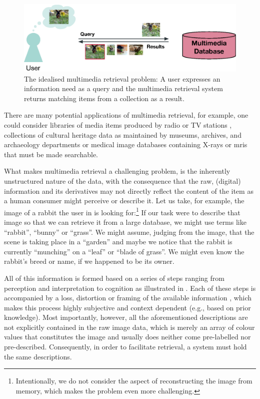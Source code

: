\begin{figure}[tb]
    \centering
    \includegraphics[width=\textwidth]{figures/mr-ideal.eps}
    \caption{The idealised multimedia retrieval problem: A user expresses an information need as a query and the multimedia retrieval system returns matching items from a collection as a result.}
    \label{figure:mr-ideal}
\end{figure}

There are many potential applications of multimedia retrieval, for example, one could consider libraries of media items produced by radio or TV stations \cite{Watanabe:1998Multimedia}, collections of cultural heritage data as maintained by museums, archives, and archaeology departments \cite{Tsai:2007Review} or medical image databases containing X-rays or \acrshort{mri}s \cite{Mueller:2004Review} that must be made searchable.

What makes multimedia retrieval a challenging problem, is the inherently unstructured nature of the data, with the consequence that the raw, (digital) information and its derivatives may not directly reflect the content of the item as a human consumer might perceive or describe it. Let us take, for example, the image of a rabbit the user in  is looking for:\footnote{Intentionally, we do not consider the aspect of reconstructing the image from memory, which makes the problem even more challenging.} If our task were to describe that image so that we can retrieve it from a large database, we might use terms like ``rabbit'', ``bunny'' or ``grass''. We might assume, judging from the image, that the scene is taking place in a ``garden'' and maybe we notice that the rabbit is currently ``munching'' on a ``leaf'' or ``blade of grass''. We might even know the rabbit's breed or name, if we happened to be its owner.

All of this information is formed based on a series of steps ranging from perception and interpretation to cognition as illustrated in . Each of these steps is accompanied by a loss, distortion or framing of the available information \cite{Javanmardi:2021Exploring}, which makes this process highly subjective and context dependent (e.g., based on prior knowledge). Most importantly, however, all the aforementioned descriptions are not explicitly contained in the raw image data, which is merely an array of colour values that constitutes the image and usually does neither come pre-labelled nor pre-described. Consequently, in order to facilitate retrieval, a system must hold the same descriptions. 

